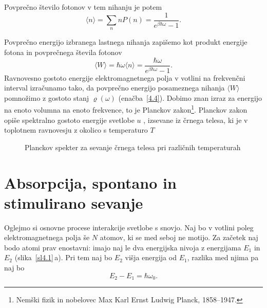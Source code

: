 Povprečno število fotonov v tem nihanju je potem 
\begin{equation}
\langle n\rangle =\sum_{n}n P(n)=\frac{1}{e^{\beta\hbar\omega}-1}.
\label{4.13}
\end{equation}

Povprečno energijo izbranega lastnega nihanja zapišemo kot produkt energije fotona in 
povprečnega števila fotonov
\begin{equation}
\langle W\rangle = \hbar \omega \langle n \rangle
= \frac{\hbar \omega}{e^{\beta\hbar\omega}-1}.
\end{equation}
Ravnovesno gostoto energije elektromagnetnega polja v votlini na
frekvenčni interval izračunamo tako, da povprečno energijo posameznega
nihanja $\langle W \rangle$ pomnožimo z gostoto stanj $\varrho (\omega)$ 
(enačba~\ref{4.4}). Dobimo znan izraz za energijo na enoto volumna na enoto frekvence, 
to je Planckov 
zakon\footnote{Nemški fizik in nobelovec Max Karl Ernst Ludwig Planck, 1858--1947.}.
Planckov zakon opiše spektralno gostoto energije svetlobe $u$ 
, izsevane iz 
črnega telesa, ki je v toplotnem ravnovesju z 
okolico s temperaturo $T$

\begin{figure}[h]
\centering
\def\svgwidth{100truemm} 

\caption{Planckov spekter za sevanje črnega telesa pri različnih temperaturah}
\label{fig:Planck}
\end{figure}

\section{Absorpcija, spontano in stimulirano sevanje}
\label{chap:ASSS}
Oglejmo si osnovne procese interakcije svetlobe s snovjo. Naj
bo v votlini poleg elektro\-mag\-net\-nega polja še $N$ atomov, ki se med
seboj ne motijo. Za začetek naj bodo atomi prav enostavni:
imajo naj le dva energijska nivoja z energijama $E_{1}$ in $E_{2}$ (slika~\ref{sl4.1}\,a). 
Pri tem naj bo $E_2$ višja energija od $E_1$, razlika med njima pa naj bo
\begin{equation}
 E_2 - E_1 = \hbar \omega_0.
\end{equation}

